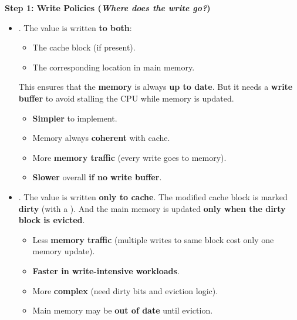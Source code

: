 \highspace
\begin{flushleft}
    \textcolor{Green3}{ \textbf{Step 1: Write Policies (\emph{Where does the write go?})}}
\end{flushleft}
\begin{itemize}
    \item {}. The value is written \textbf{to both}:
    \begin{itemize}
        \item The cache block (if present).
        \item The corresponding location in main memory.
    \end{itemize}
    This ensures that the \textbf{memory} is always \textbf{up to date}. But it needs a \textbf{write buffer} to avoid stalling the CPU while memory is updated.
    \begin{itemize}
        \item[\textcolor{Green3}{\faIcon{check}}] \textbf{Simpler} to implement.
        \item[\textcolor{Green3}{\faIcon{check}}] Memory always \textbf{coherent} with cache.
        \item[\textcolor{Red2}{\faIcon{times}}] More \textbf{memory traffic} (every write goes to memory).
        \item[\textcolor{Red2}{\faIcon{times}}] \textbf{Slower} overall \textbf{if no write buffer}.
    \end{itemize}

    \item {}. The value is written \textbf{only to cache}. The modified cache block is marked \textbf{dirty} (with a ). And the main memory is updated \textbf{only when the dirty block is evicted}.
    \begin{itemize}
        \item[\textcolor{Green3}{\faIcon{check}}] Less \textbf{memory traffic} (multiple writes to same block cost only one memory update).
        \item[\textcolor{Green3}{\faIcon{check}}] \textbf{Faster in write-intensive workloads}.
        \item[\textcolor{Red2}{\faIcon{times}}] More \textbf{complex} (need dirty bits and eviction logic).
        \item[\textcolor{Red2}{\faIcon{times}}] Main memory may be \textbf{out of date} until eviction.
    \end{itemize}
\end{itemize}

